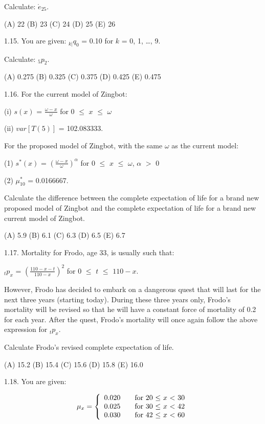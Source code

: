 \documentclass[]{book}
\begin{document}
Calculate: \(\mathring{e}_{25}\).

(A) 22 (B) 23 (C) 24 (D) 25 (E) 26

1.15. You are given: \({}_{k|}q_0\) = 0.10 for \(k\) = 0, 1, \ldots{},
9.

Calculate: \({}_{5}p_2\).

(A) 0.275 (B) 0.325 (C) 0.375 (D) 0.425 (E) 0.475

1.16. For the current model of Zingbot:

(i) \(s(x)\) = \(\frac{\omega - x}{\omega}\) for 0 \(\le\) \(x\) \(\le\)
\(\omega\)

(ii) \(var[T(5)]\) = 102.083333.

For the proposed model of Zingbot, with the same \(\omega\) as the
current model:

(1) \(s^*(x)\) = \((\frac{\omega - x}{\omega})^{\alpha}\) for 0 \(\le\)
\(x\) \(\le\) \(\omega\), \(\alpha\) \(>\) 0

(2) \(\mu^*_{10}\) = 0.0166667.

Calculate the difference between the complete expectation of life for a
brand new proposed model of Zingbot and the complete expectation of life
for a brand new current model of Zingbot.

(A) 5.9 (B) 6.1 (C) 6.3 (D) 6.5 (E) 6.7

1.17. Mortality for Frodo, age 33, is usually such that:

\({}_{t}p_x\) = \(\left(\frac{110 - x - t}{110 - x}\right)^{2}\) for 0
\(\le\) \(t\) \(\le\) \(110 - x\).

However, Frodo has decided to embark on a dangerous quest that will last
for the next three years (starting today). During these three years
only, Frodo's mortality will be revised so that he will have a constant
force of mortality of 0.2 for each year. After the quest, Frodo's
mortality will once again follow the above expression for \({}_{t}p_x\).

Calculate Frodo's revised complete expectation of life.

(A) 15.2 (B) 15.4 (C) 15.6 (D) 15.8 (E) 16.0

1.18. You are given:

\[\mu_x = \left\{
  \begin{array}{l l l}
    0.020       & \quad \text{for 20 $\le$ $x$ $<$ 30}\\
    0.025       & \quad \text{for 30 $\le$ $x$ $<$ 42}\\
    0.030       & \quad \text{for 42 $\le$ $x$ $<$ 60}\\
  \end{array} \right.\]
\end{document}
